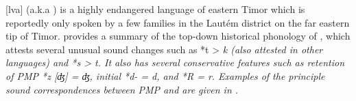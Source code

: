  [lva] (a.k.a ) is a highly endangered language of
eastern Timor which is reportedly only spoken by a few families
in the Lautém district on the far eastern tip of Timor.
\citet{vanEngelenhoven2009} provides a summary of the top-down
historical phonology of ,
which attests several unusual sound changes such as *t > \it{k}
(also attested in other  languages)
and *s > \it{t}.
It also has several conservative features such as retention of
PMP *z [ʤ] = \it{ʤ}, initial *d- = \it{d}, and *R = \it{r}.
Examples of the principle sound correspondences between PMP
and  are given in .

